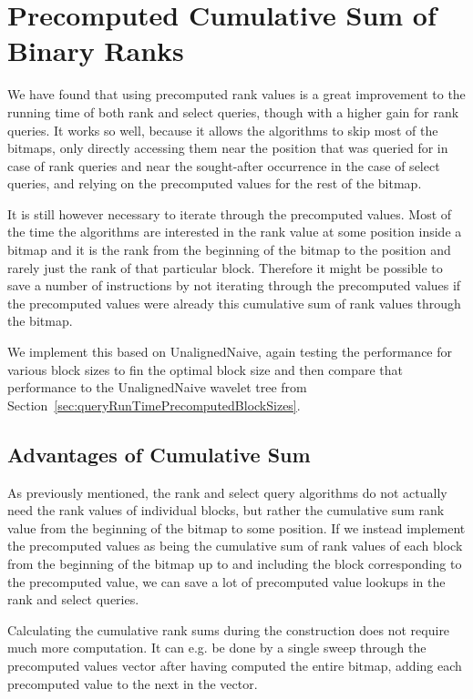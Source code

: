 \section{Precomputed Cumulative Sum of Binary Ranks}
We have found that using precomputed rank values is a great improvement to the running time of both rank and select queries, though with a higher gain for rank queries.
It works so well, because it allows the algorithms to skip most of the bitmaps, only directly accessing them near the position that was queried for in case of rank queries and near the sought-after occurrence in the case of select queries, and relying on the precomputed values for the rest of the bitmap.

It is still however necessary to iterate through the precomputed values.
Most of the time the algorithms are interested in the rank value at some position inside a bitmap and it is the rank from the beginning of the bitmap to the position and rarely just the rank of that particular block.
Therefore it might be possible to save a number of instructions by not iterating through the precomputed values if the precomputed values were already this cumulative sum of rank values through the bitmap.

We implement this based on UnalignedNaive, again testing the performance for various block sizes to fin the optimal block size and then compare that performance to the UnalignedNaive wavelet tree from Section~\ref{sec:queryRunTimePrecomputedBlockSizes}.

\subsection{Advantages of Cumulative Sum}
\label{sec:AdvantagesOfCumulativeSum}
As previously mentioned, the rank and select query algorithms do not actually need the rank values of individual blocks, but rather the cumulative sum rank value from the beginning of the bitmap to some position.
If we instead implement the precomputed values as being the cumulative sum of rank values of each block from the beginning of the bitmap up to and including the block corresponding to the precomputed value, we can save a lot of precomputed value lookups in the rank and select queries.

Calculating the cumulative rank sums during the construction does not require much more computation.
It can e.g. be done by a single sweep through the precomputed values vector after having computed the entire bitmap, adding each precomputed value to the next in the vector.

